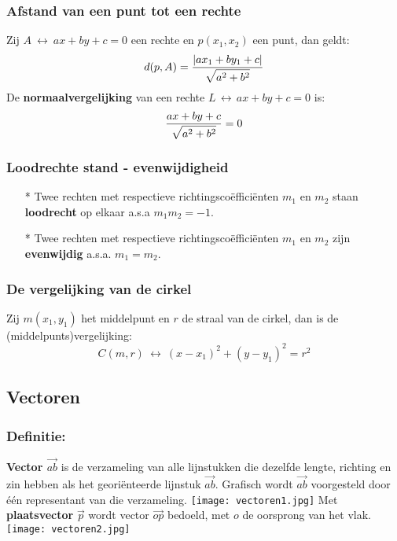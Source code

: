 \subsubsection{Afstand van een punt tot een rechte} \label{afstand_punt-rechte}
\hypertarget{afstand_punt-rechte}{}
Zij $A\:\leftrightarrow\:ax+by+c=0$ een rechte en $p(x_1, x_2)$ een punt, dan geldt:\newline
\[d(p, A)=\displaystyle\frac{\displaystyle |ax_1+by_1+c|}{\displaystyle \sqrt{a^2+b^2}}\]
De \hypertarget{normaalvergelijking}{{\bf normaalvergelijking}} van een rechte $L\,\leftrightarrow\,ax +by+c=0$ is:\label{normaalvergelijking}
\[\displaystyle\frac{\displaystyle ax+by+c}{\displaystyle \sqrt{a^2 + b^2}}=0\]

\subsubsection{Loodrechte stand - evenwijdigheid} \label{loodrecht-evenwijdig}
\hypertarget{loodrecht-evenwijdig}{}
\begin{itemize}
\item[*]Twee rechten met respectieve richtingsco\"effici\"enten $m_1$ en $m_2$ staan {\bf loodrecht} op elkaar a.s.a $m_1m_2=-1$.
\item[*]Twee rechten met respectieve richtingsco\"effici\"enten $m_1$ en $m_2$ zijn {\bf evenwijdig} a.s.a. $m_1=m_2$.
\end{itemize}

\subsubsection{De vergelijking van de cirkel} \label{vergelijking_cirkel}
\hypertarget{vergelijking_cirkel}{}
Zij $m(x_1,y_1)$ het middelpunt en $r$ de straal van de cirkel, dan is de (middelpunts)vergelijking:
\[C(m, r)\:\leftrightarrow\:(x-x_1)^2+(y-y_1)^2=r^2\]

\subsection{Vectoren} \label{vectoren}
\hypertarget{vectoren}{}

\subsubsection{Definitie:} \label{definitie}
\hypertarget{definitie}{}
{\bf Vector $\vec{ab}$} is de verzameling van alle lijnstukken die dezelfde lengte, richting en 
zin hebben als het geori\"enteerde lijnstuk $\vec{ab}$.\newline
Grafisch wordt $\vec{ab}$ voorgesteld door \'e\'en representant van die verzameling.\newline
\texttt{[image: vectoren1.jpg]}
Met {\bf plaatsvector} $\vec{p}$ wordt vector $\vec{op}$ bedoeld, met $o$ de oorsprong van het vlak.\newline
\texttt{[image: vectoren2.jpg]}

